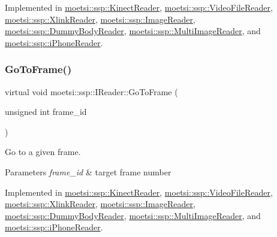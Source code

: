Implemented in \hyperlink{classmoetsi_1_1ssp_1_1KinectReader_aef896aa686cbe1ea82dfc6aad46b6ff7}{moetsi\+::ssp\+::\+Kinect\+Reader}, \hyperlink{classmoetsi_1_1ssp_1_1VideoFileReader_a9d47af47299c5fccf766ac2d848a561b}{moetsi\+::ssp\+::\+Video\+File\+Reader}, \hyperlink{classmoetsi_1_1ssp_1_1XlinkReader_a2119c9bc9e4929ff37115a7be463eb92}{moetsi\+::ssp\+::\+Xlink\+Reader}, \hyperlink{classmoetsi_1_1ssp_1_1ImageReader_af6f66957b6e3268c5336f4176c77fc73}{moetsi\+::ssp\+::\+Image\+Reader}, \hyperlink{classmoetsi_1_1ssp_1_1DummyBodyReader_a2219d7fd14ca1448fb4c6f2541ac3c9b}{moetsi\+::ssp\+::\+Dummy\+Body\+Reader}, \hyperlink{classmoetsi_1_1ssp_1_1MultiImageReader_ad5f6cf0cfb1e64bcf569ab0bbfcce9d6}{moetsi\+::ssp\+::\+Multi\+Image\+Reader}, and \hyperlink{classmoetsi_1_1ssp_1_1iPhoneReader_a05d285ace85fc570bc2f453a0862ae56}{moetsi\+::ssp\+::i\+Phone\+Reader}.

\mbox{\label{classmoetsi_1_1ssp_1_1IReader_a6f1be3c06538992cca6d550bd9566681}} 
\subsubsection{\texorpdfstring{Go\+To\+Frame()}{GoToFrame()}\hspace{0.1cm}{\footnotesize\ttfamily [1/2]}}
{\footnotesize\ttfamily virtual void moetsi\+::ssp\+::\+I\+Reader\+::\+Go\+To\+Frame (\begin{DoxyParamCaption}\item[{unsigned int}]{frame\+\_\+id }\end{DoxyParamCaption})\hspace{0.3cm}{\ttfamily [pure virtual]}}



Go to a given frame. 


\begin{DoxyParams}{Parameters}
{\em frame\+\_\+id} & target frame number \\
\hline
\end{DoxyParams}


Implemented in \hyperlink{classmoetsi_1_1ssp_1_1KinectReader_a315690c46e153a35d4ded1189e93af08}{moetsi\+::ssp\+::\+Kinect\+Reader}, \hyperlink{classmoetsi_1_1ssp_1_1VideoFileReader_ad98a532db8b1e2c3879df274b2efb082}{moetsi\+::ssp\+::\+Video\+File\+Reader}, \hyperlink{classmoetsi_1_1ssp_1_1XlinkReader_af540d074aeb4d3075db45c246fd48627}{moetsi\+::ssp\+::\+Xlink\+Reader}, \hyperlink{classmoetsi_1_1ssp_1_1ImageReader_a32eb88cc612e6920f4910e0803b0ce3c}{moetsi\+::ssp\+::\+Image\+Reader}, \hyperlink{classmoetsi_1_1ssp_1_1DummyBodyReader_a61e495deb7314560d5e17388f6b6938f}{moetsi\+::ssp\+::\+Dummy\+Body\+Reader}, \hyperlink{classmoetsi_1_1ssp_1_1MultiImageReader_a7c552a1ad469660ea0a88b9ca85138ad}{moetsi\+::ssp\+::\+Multi\+Image\+Reader}, and \hyperlink{classmoetsi_1_1ssp_1_1iPhoneReader_a27b6dea97e4c4db8e4e749cc9e30e7ca}{moetsi\+::ssp\+::i\+Phone\+Reader}.

